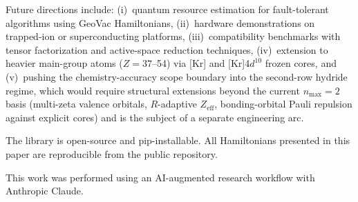 \documentclass[twocolumn,pra,amsmath,amssymb,superscriptaddress]{revtex4-2}
\begin{document}
Future directions include: (i)~quantum resource estimation for
fault-tolerant algorithms using GeoVac Hamiltonians, (ii)~hardware
demonstrations on trapped-ion or superconducting platforms,
(iii)~compatibility benchmarks with tensor factorization and
active-space reduction techniques, (iv)~extension to heavier main-group atoms
($Z = 37$--54) via [Kr] and [Kr]4$d^{10}$ frozen cores, and
(v)~pushing the chemistry-accuracy scope boundary into the second-row
hydride regime, which would require structural extensions beyond the
current $n_{\max}=2$ basis (multi-zeta valence orbitals,
$R$-adaptive $Z_{\text{eff}}$, bonding-orbital Pauli repulsion against
explicit cores) and is the subject of a separate engineering arc.

The library is open-source and pip-installable. All Hamiltonians
presented in this paper are reproducible from the public repository.

\begin{acknowledgments}
This work was performed using an AI-augmented research workflow
with Anthropic Claude.
\end{acknowledgments}


\end{document}
